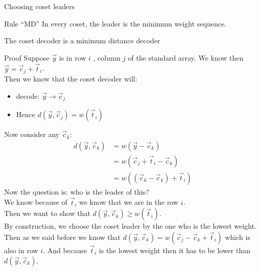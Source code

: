 \begin{parag}{Choosing coset leaders}
   \begin{subparag}{Rule ``MD''}
       In every coset, the leader is the minimum weight sequence.
   \end{subparag}
   \begin{theoreme}
   The coset decoder is a minimum distance decoder
   \end{theoreme}
   \begin{subparag}{Proof}
       Suppose $\vec{y}$ is in row $i$ , column $j$ of the standard array. We know then $\vec{y} =  \vec{c}_j + \vec{t}_i$.\\
       Then we know that the coset decoder will:
       \begin{itemize}
           \item decode: $\vec{y} \to \vec{c}_j$
           \item Hence $d\left(\vec{y}, \vec{c}_j\right) =  w\left(\vec{t}_i\right)$
       \end{itemize}
       Now consider any $\vec{c}_k$:
       \begin{align*} 
           d\left(\vec{y}, \vec{c}_k\right) &= w\left(\vec{y} - \vec{c}_k\right)\\
                                     &= w\left(\vec{c}_j + \vec{t}_i - \vec{c}_k\right)\\
                                     &= w\left(\left(\vec{c}_k - \vec{c}_k\right) + \vec{t}_i\right)
       \end{align*}
       Now the question is: who is the leader of this?\\
       We know because of $\vec{t}_i$ we know that we are in the row $i$.\\
       Then we want to show that $d\left(\vec{y}, \vec{c}_k\right) \geq w\left(\vec{t}_i\right)$.\\
       By construction, we choose the coset leader by the one who is the lowest weight. Then as we said before we know that $d\left(\vec{y}, \vec{c}_k\right) = w\left(\vec{c}_j - \vec{c}_k +\vec{t}_i\right)$ which is also in row $i$. And because $\vec{t}_i$ is the lowest weight then it has to be lower than $d\left(\vec{y}, \vec{c}_k\right)$.
   \end{subparag}
\end{parag}


